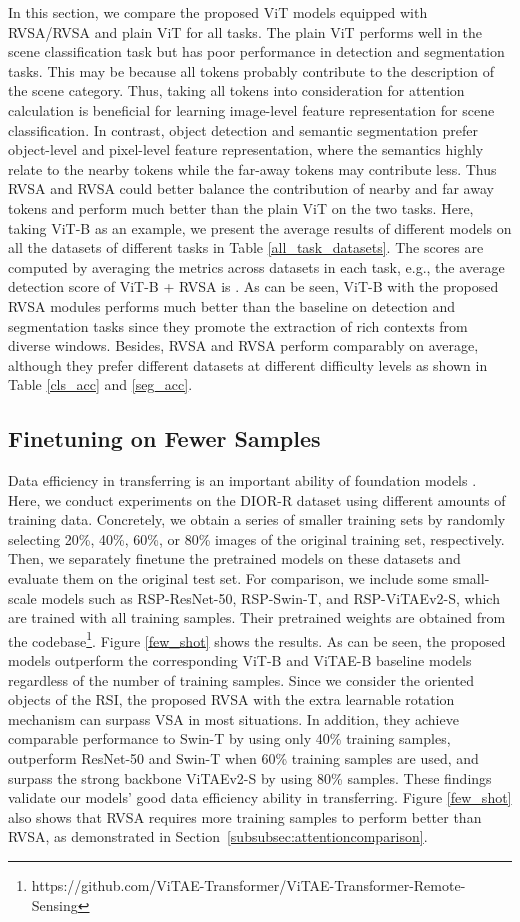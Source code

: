 \documentclass[10pt, journal,twoside]{IEEEtran}
\begin{document}
In this section, we compare the proposed ViT models equipped with RVSA/RVSA and plain ViT for all tasks. The plain ViT performs well in the scene classification task but has poor performance in detection and segmentation tasks. This may be because all tokens probably contribute to the description of the scene category. Thus, taking all tokens into consideration for attention calculation is beneficial for learning image-level feature representation for scene classification. In contrast, object detection and semantic segmentation prefer object-level and pixel-level feature representation, where the semantics highly relate to the nearby tokens while the far-away tokens may contribute less. Thus RVSA and RVSA could better balance the contribution of nearby and far away tokens and perform much better than the plain ViT on the two tasks. Here, taking ViT-B as an example, we present the average results of different models on all the datasets of different tasks in Table \ref{all_task_datasets}. The scores are computed by averaging the metrics across datasets in each task, e.g., the average detection score of ViT-B + RVSA is . As can be seen, ViT-B with the proposed RVSA modules performs much better than the baseline on detection and segmentation tasks since they promote the extraction of rich contexts from diverse windows. Besides, RVSA and RVSA perform comparably on average, although they prefer different datasets at different difficulty levels as shown in Table \ref{cls_acc} and \ref{seg_acc}.


\subsection{Finetuning on Fewer Samples}
Data efficiency in transferring is an important ability of foundation models \cite{bommasani2021opportunities, vitae_v2,GPT}. Here, we conduct experiments on the DIOR-R dataset using different amounts of training data. Concretely, we obtain a series of smaller training sets by randomly selecting 20\%, 40\%, 60\%, or 80\% images of the original training set, respectively. Then, we separately finetune the pretrained models on these datasets and evaluate them on the original test set. For comparison, we include some small-scale models such as RSP-ResNet-50, RSP-Swin-T, and RSP-ViTAEv2-S, which are trained with all training samples. Their pretrained weights are obtained from the codebase\footnote{https://github.com/ViTAE-Transformer/ViTAE-Transformer-Remote-Sensing}. Figure \ref{few_shot} shows the results. As can be seen, the proposed models outperform the corresponding ViT-B and ViTAE-B baseline models regardless of the number of training samples. Since we consider the oriented objects of the RSI, the proposed RVSA with the extra learnable rotation mechanism can surpass VSA in most situations. In addition, they achieve comparable performance to Swin-T by using only 40\% training samples, outperform ResNet-50 and Swin-T when 60\% training samples are used, and surpass the strong backbone ViTAEv2-S by using 80\% samples. These findings validate our models' good data efficiency ability in transferring.  Figure \ref{few_shot} also shows that RVSA requires more training samples to perform better than RVSA, as demonstrated in Section~\ref{subsubsec:attentioncomparison}.
\end{document}
